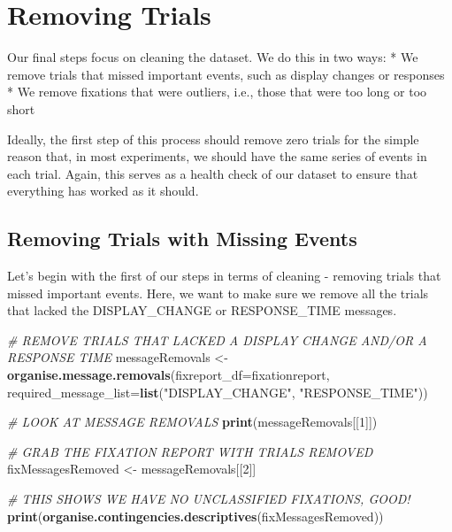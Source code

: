 \documentclass[]{book}
\newenvironment{Shaded}{\begin{snugshade}}{\end{snugshade}}
\newcommand{\CommentTok}[1]{\textcolor[rgb]{0.56,0.35,0.01}{\textit{#1}}}
\newcommand{\DataTypeTok}[1]{\textcolor[rgb]{0.13,0.29,0.53}{#1}}
\newcommand{\DecValTok}[1]{\textcolor[rgb]{0.00,0.00,0.81}{#1}}
\newcommand{\KeywordTok}[1]{\textcolor[rgb]{0.13,0.29,0.53}{\textbf{#1}}}
\newcommand{\NormalTok}[1]{#1}
\newcommand{\StringTok}[1]{\textcolor[rgb]{0.31,0.60,0.02}{#1}}
\begin{document}
\hypertarget{removing-trials}{%
\section{Removing Trials}\label{removing-trials}}

Our final steps focus on cleaning the dataset. We do this in two ways:
* We remove trials that missed important events, such as display changes or responses
* We remove fixations that were outliers, i.e., those that were too long or too short

Ideally, the first step of this process should remove zero trials for the simple reason that, in most experiments, we should have the same series of events in each trial. Again, this serves as a health check of our dataset to ensure that everything has worked as it should.

\hypertarget{removing-trials-with-missing-events}{%
\subsection{Removing Trials with Missing Events}\label{removing-trials-with-missing-events}}

Let's begin with the first of our steps in terms of cleaning - removing trials that missed important events. Here, we want to make sure we remove all the trials that lacked the DISPLAY\_CHANGE or RESPONSE\_TIME messages.

\begin{Shaded}
\begin{Highlighting}[]
\CommentTok{# REMOVE TRIALS THAT LACKED A DISPLAY CHANGE AND/OR A RESPONSE TIME}
\NormalTok{messageRemovals <-}\StringTok{ }\KeywordTok{organise.message.removals}\NormalTok{(}\DataTypeTok{fixreport_df=}\NormalTok{fixationreport, }
    \DataTypeTok{required_message_list=}\KeywordTok{list}\NormalTok{(}\StringTok{"DISPLAY_CHANGE"}\NormalTok{, }\StringTok{"RESPONSE_TIME"}\NormalTok{))}

\CommentTok{# LOOK AT MESSAGE REMOVALS}
\KeywordTok{print}\NormalTok{(messageRemovals[[}\DecValTok{1}\NormalTok{]])}

\CommentTok{# GRAB THE FIXATION REPORT WITH TRIALS REMOVED}
\NormalTok{fixMessagesRemoved <-}\StringTok{ }\NormalTok{messageRemovals[[}\DecValTok{2}\NormalTok{]]}

\CommentTok{# THIS SHOWS WE HAVE NO UNCLASSIFIED FIXATIONS, GOOD!}
\KeywordTok{print}\NormalTok{(}\KeywordTok{organise.contingencies.descriptives}\NormalTok{(fixMessagesRemoved))}
\end{Highlighting}
\end{Shaded}
\end{document}
